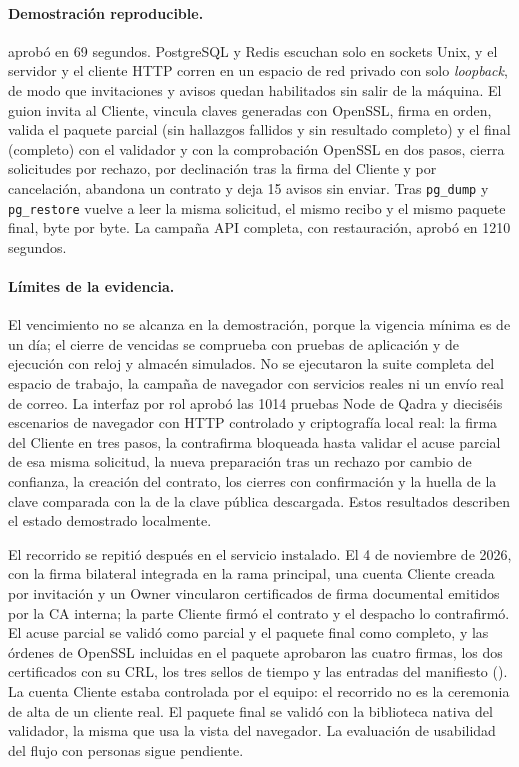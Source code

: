 \paragraph{Demostración reproducible.} 
aprobó en 69 segundos. PostgreSQL y Redis escuchan solo en sockets Unix, y el
servidor y el cliente HTTP corren en un espacio de red privado con solo
\emph{loopback}, de modo que invitaciones y avisos quedan habilitados sin salir
de la máquina. El guion invita al Cliente, vincula claves generadas con
OpenSSL, firma en orden, valida el paquete parcial (sin hallazgos fallidos y
sin resultado completo) y el final (completo) con el validador y con la
comprobación OpenSSL en dos pasos, cierra solicitudes por rechazo, por
declinación tras la firma del Cliente y por cancelación, abandona un contrato
y deja 15 avisos sin enviar. Tras \texttt{pg\_dump} y \texttt{pg\_restore}
vuelve a leer la misma solicitud, el mismo recibo y el mismo paquete final,
byte por byte. La campaña API completa, con restauración, aprobó en 1210
segundos.

\paragraph{Límites de la evidencia.} El vencimiento no se alcanza en la
demostración, porque la vigencia mínima es de un día; el cierre de vencidas se
comprueba con pruebas de aplicación y de ejecución con reloj y almacén
simulados. No se ejecutaron la suite completa del espacio de trabajo, la
campaña de navegador con servicios reales ni un envío real de correo. La
interfaz por rol aprobó las 1014 pruebas Node de Qadra y dieciséis escenarios
de navegador con HTTP controlado y criptografía local real: la firma del
Cliente en tres pasos, la contrafirma bloqueada hasta validar el acuse parcial
de esa misma solicitud, la nueva preparación tras un rechazo por cambio de
confianza, la creación del contrato, los cierres con confirmación y la huella
de la clave comparada con la de la clave pública descargada. Estos resultados describen el estado
demostrado localmente.

El recorrido se repitió después en el servicio instalado. El 4 de noviembre de
2026, con la firma bilateral integrada en la rama principal, una cuenta Cliente
creada por invitación y un Owner vincularon certificados de firma documental
emitidos por la CA interna; la parte Cliente firmó el contrato y el despacho lo
contrafirmó. El acuse parcial se validó como parcial y el paquete final como
completo, y las órdenes de OpenSSL incluidas en el paquete aprobaron las
cuatro firmas, los dos certificados con su CRL, los tres sellos de tiempo y las
entradas del manifiesto (). La cuenta
Cliente estaba controlada por el equipo: el recorrido no es la ceremonia de
alta de un cliente real. El paquete final se validó con la biblioteca nativa
del validador, la misma que usa la vista del navegador. La evaluación de
usabilidad del flujo con personas sigue pendiente.
